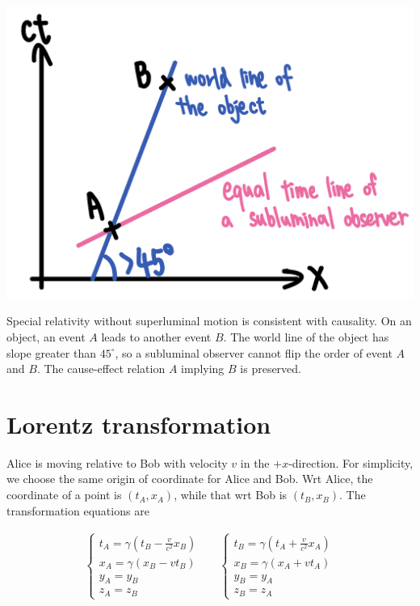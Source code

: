 \documentclass[12pt]{book} %
\numberwithin{equation}{chapter}
\def\c{\gamma}
\begin{document}
\begin{minipage}[c]{0.4\textwidth}
    \centering
    \includegraphics[width=\textwidth]{Spacetime diagram casuality}
\end{minipage}
\hfill
\begin{minipage}[c]{0.55\textwidth}
    \begin{example}
        Special relativity without superluminal motion is consistent with causality. On an object, an event $A$ leads to another event $B$. The world line of the object has slope greater than $45^\circ$, so a subluminal observer cannot flip the order of event $A$ and $B$. The cause-effect relation $A$ implying $B$ is preserved.
    \end{example}
\end{minipage}

\section{Lorentz transformation}
Alice is moving relative to Bob with velocity $v$ in the $+x$-direction. For simplicity, we choose the same origin of coordinate for Alice and Bob. Wrt Alice, the coordinate of a point is $\left(t_{A}, x_{A}\right)$, while that wrt Bob is $\left(t_{B}, x_{B}\right)$.\bigskip\newline
The transformation equations are
\begin{eqnbox}
\begin{align}
\begin{cases}
t_{A}=\c\left(t_{B}-\frac{v}{c^{2}}x_{B}\right)\\
x_{A}=\c\left(x_{B}-vt_{B}\right)\\
y_{A}=y_{B}\\
z_{A}=z_{B}
\end{cases}
&&
\begin{cases}
t_{B}=\c\left(t_{A}+\frac{v}{c^{2}}x_{A}\right)\\
x_{B}=\c\left(x_{A}+vt_{A}\right)\\
y_{B}=y_{A}\\
z_{B}=z_{A}
\end{cases}
\end{align}
\end{eqnbox}
\end{document}
